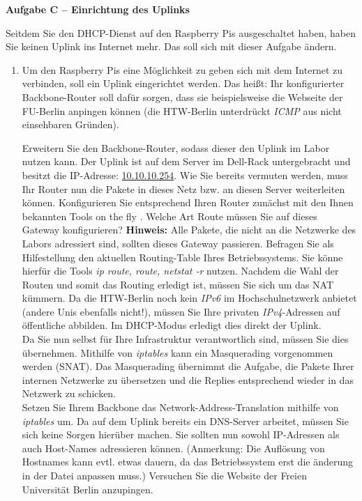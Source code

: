 \documentclass[paper=a4,fontsize=11pt]{scrartcl}%
\numberwithin{equation}{section}
\begin{document}
\begin{enumerate}
\begin{center}\Large{\textbf{Aufgabe C -- Einrichtung des Uplinks}}\end{center}\vskip0.25in
Seitdem Sie den DHCP-Dienst auf den Raspberry Pis ausgeschaltet haben, haben Sie keinen Uplink ins Internet mehr. Das soll sich mit dieser Aufgabe ändern.
\begin{enumerate}
	\item Um den Raspberry Pis eine Möglichkeit zu geben sich mit dem Internet zu verbinden, soll ein Uplink eingerichtet werden. Das heißt: Ihr konfigurierter Backbone-Router soll dafür sorgen, dass sie beispielsweise die Webseite der FU-Berlin anpingen können (die HTW-Berlin unterdrückt \emph{ICMP} aus nicht einsehbaren Gründen).
\begin{tasks}
  \task Erweitern Sie den Backbone-Router, sodass dieser den Uplink im Labor nutzen kann. Der Uplink ist auf dem Server im Dell-Rack untergebracht und besitzt die IP-Adresse: \url{10.10.10.254}. Wie Sie bereits vermuten werden, muss Ihr Router nun die Pakete in dieses Netz bzw. an diesen Server weiterleiten können. Konfigurieren Sie entsprechend Ihren Router zunächst mit den Ihnen bekannten Tools \glqq on the fly \grqq.
  \task Welche Art Route müssen Sie auf dieses Gateway konfigurieren? \textbf{Hinweis:} Alle Pakete, die nicht an die Netzwerke des Labors adressiert sind, sollten dieses Gateway passieren.
  \task Befragen Sie als Hilfestellung den aktuellen Routing-Table Ihres Betriebssystems. Sie könne hierfür die Tools \emph{ip route, route, netstat -r} nutzen.
  \task Nachdem die Wahl der Routen und somit das Routing erledigt ist, müssen Sie sich um das NAT kümmern. Da die HTW-Berlin noch kein \emph{IPv6} im Hochschulnetzwerk anbietet (andere Unis ebenfalls nicht!), müssen Sie Ihre privaten \emph{IPv4}-Adressen auf öffentliche abbilden. Im DHCP-Modus erledigt dies direkt der Uplink.\\
Da Sie nun selbst für Ihre Infrastruktur verantwortlich sind, müssen Sie dies übernehmen. Mithilfe von \emph{iptables} kann ein Masquerading vorgenommen werden (SNAT). Das Masquerading übernimmt die Aufgabe, die Pakete Ihrer internen Netzwerke zu übersetzen und die Replies entsprechend wieder in das Netzwerk zu schicken.\\
Setzen Sie Ihrem Backbone das Network-Address-Translation mithilfe von \emph{iptables} um.
  \task Da auf dem Uplink bereits ein DNS-Server arbeitet, müssen Sie sich keine Sorgen hierüber machen. Sie sollten nun sowohl IP-Adressen als auch Host-Names adressieren können. (Anmerkung: Die Auflösung von Hostnames kann evtl. etwas dauern, da das Betriebssystem erst die änderung in der Datei  anpassen muss.)
  \task Versuchen Sie die Website der Freien Universität Berlin anzupingen.
\end{tasks}
\end{enumerate}


\end{enumerate}
\end{document}

